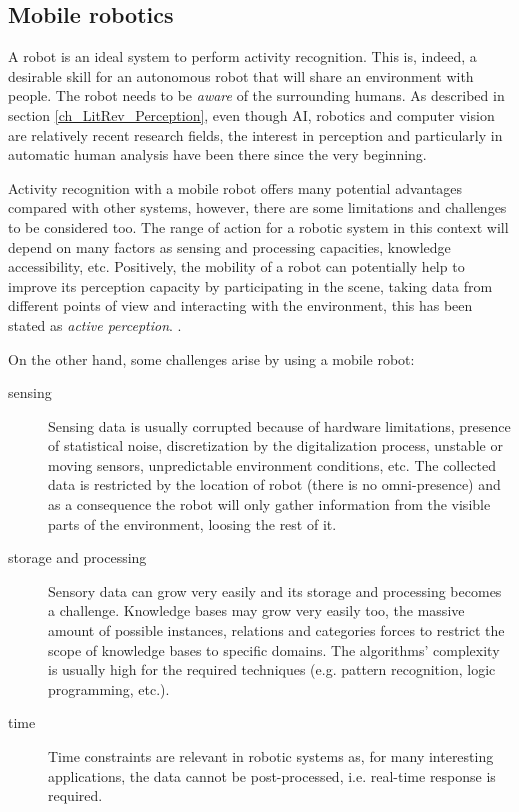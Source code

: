 



\subsection{Mobile robotics}
A robot is an ideal system to perform activity recognition. 
This is, indeed, a desirable skill for an autonomous robot that will share an environment with people.
The robot needs to be \textit{aware} of the surrounding humans.
As described in section \ref{ch_LitRev_Perception}, even though AI, robotics and computer vision are relatively recent research fields, the interest in perception and particularly in automatic human analysis have been there since the very beginning.

Activity recognition with a mobile robot offers many potential advantages compared with other systems, however, there are some limitations and challenges to be considered too.
The range of action for a robotic system in this context will depend on many factors as sensing and processing capacities, knowledge accessibility, etc.
Positively, the mobility of a robot can potentially help to improve its perception capacity by participating in the scene, taking data from different points of view and interacting with the environment, this has been stated as \textit{active perception}. \citep{Bajcsy88_ActivePerception}.

On the other hand, some challenges arise by using a mobile robot:
\begin{description}
\item[sensing] Sensing data is usually corrupted because of hardware limitations, presence of statistical noise, discretization by the digitalization process, unstable or moving sensors, unpredictable environment conditions, etc.
The collected data is restricted by the location of robot (there is no omni-presence) and as a consequence the robot will only gather information from the visible parts of the environment, loosing the rest of it.
\item[storage and processing] %
Sensory data can grow very easily and its storage and processing becomes a challenge.
Knowledge bases may grow very easily too, the massive amount of possible instances, relations and categories forces to restrict the scope of knowledge bases to specific domains. %
The algorithms' complexity is usually high for the required techniques (e.g. pattern recognition, logic programming, etc.). 
\item[time] Time constraints are relevant in robotic systems as, for many interesting applications, the data cannot be post-processed, i.e. real-time response is required.
\end{description}

